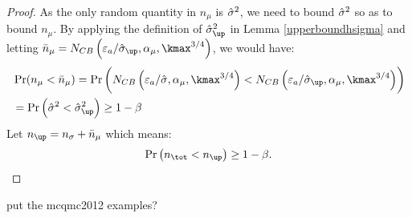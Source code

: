 \documentclass{iitthesis}
\begin{document}
\begin{proof}
As the only random quantity in $n_\mu$ is $\hat{\sigma}^2$, we need to bound $\hat{\sigma}^2$ so as  to bound $n_{\mu}$.
 By applying the definition of $\hsigma_{\up}^2$ in Lemma \ref{upperboundhsigma} and letting $\bar{n}_{\mu} = N_{CB}\left(\varepsilon_a/\hsigma_{\up},\alpha_\mu, \kmax^{3/4}\right)$, we would have:
\begin{align}
& \Pr(n_{\mu} < \bar{n}_{\mu})  = \Pr\left (N_{CB}\left(\varepsilon_a/\hsigma,\alpha_\mu, \kmax^{3/4}\right) < N_{CB}\left(\varepsilon_a/\hsigma_{\up},\alpha_\mu, \kmax^{3/4}\right) \right)\\&
 = \Pr \left(\hsigma^2 < \hsigma_{\up}^2 \right) \geq 1-\beta
\end{align}
Let $n_{\up} =n_\sigma+\bar{n}_{\mu} $
which means:
\begin{align}
\Pr \left(n_{\tot} < n_{\up}\right)  \geq 1-\beta.
\end{align}
\end{proof}
put the mcqmc2012 examples?

\label{chapter:meanMCg}
\end{document}
